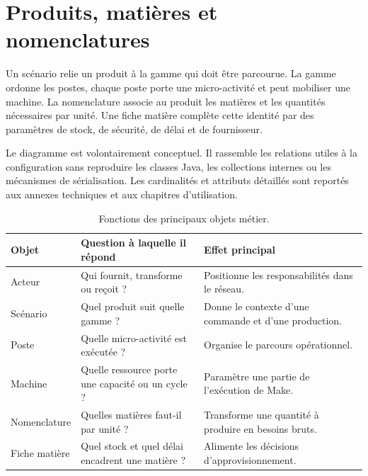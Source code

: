 \section{Produits, matières et nomenclatures}

Un scénario relie un produit à la gamme qui doit être parcourue. La gamme ordonne les postes, chaque poste porte une micro-activité et peut mobiliser une machine. La nomenclature associe au produit les matières et les quantités nécessaires par unité. Une fiche matière complète cette identité par des paramètres de stock, de sécurité, de délai et de fournisseur.


Le diagramme est volontairement conceptuel. Il rassemble les relations utiles à la configuration sans reproduire les classes Java, les collections internes ou les mécanismes de sérialisation. Les cardinalités et attributs détaillés sont reportés aux annexes techniques et aux chapitres d'utilisation.

\begin{table}[H]
  \centering
  \begin{tabularx}{\textwidth}{L{0.20\textwidth} Y Y}
    \toprule
    Objet & Question à laquelle il répond & Effet principal \\
    \midrule
    Acteur & Qui fournit, transforme ou reçoit ? & Positionne les responsabilités dans le réseau. \\
    Scénario & Quel produit suit quelle gamme ? & Donne le contexte d'une commande et d'une production. \\
    Poste & Quelle micro-activité est exécutée ? & Organise le parcours opérationnel. \\
    Machine & Quelle ressource porte une capacité ou un cycle ? & Paramètre une partie de l'exécution de Make. \\
    Nomenclature & Quelles matières faut-il par unité ? & Transforme une quantité à produire en besoins bruts. \\
    Fiche matière & Quel stock et quel délai encadrent une matière ? & Alimente les décisions d'approvisionnement. \\
    \bottomrule
  \end{tabularx}
  \caption{Fonctions des principaux objets métier.}
  \label{tab:objets-metier}
\end{table}

